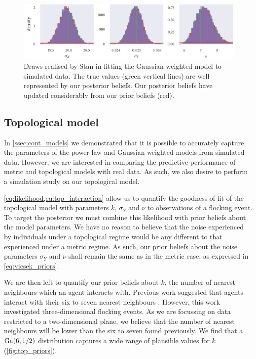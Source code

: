 \begin{figure}[tbp]
  \includegraphics{stan_gauss_hist.pdf}
  \caption{Draws realised by Stan in fitting the Gaussian weighted model to simulated
    data. The true values (green vertical lines) are well represented by our posterior
    beliefs. Our posterior beliefs have updated considerably from our prior beliefs
    (red).}
  \label{fig:gauss_sim_study_hists}
\end{figure}

\subsection{Topological model}

In \cref{ssec:cont_models} we demonstrated that it is possible to accurately capture the
parameters of the power-law and Gaussian weighted models from simulated data. However, we
are interested in comparing the predictive-performance of metric and topological models
with real data. As such, we also desire to perform a simulation study on our topological
model.

\cref{eq:likelihood,eq:top_interaction} allow us to quantify the goodness of fit of the
topological model with parameters $k$, $\sigma_Y$ and $\nu$ to observations of a flocking
event. To target the posterior we must combine this likelihood with prior beliefs about
the model parameters. We have no reason to believe that the noise experienced by
individuals under a topological regime would be any different to that experienced under a
metric regime. As such, our prior beliefs about the noise parameters $\sigma_Y$ and $\nu$
shall remain the same as in the metric case: as expressed in \cref{eq:vicsek_priors}.

We are then left to quantify our prior beliefs about $k$, the number of nearest neighbours
which an agent interacts with. Previous work suggested that agents interact with their six
to seven nearest neighbours \parencite{ballerini08}. However, this work investigated
three-dimensional flocking events. As we are focussing on data restricted to a
two-dimensional plane, we believe that the number of nearest neighbours will be lower than
the six to seven found previously. We find that a $\textrm{Ga}(6, 1/2)$ distribution captures a
wide range of plausible values for $k$ (\cref{fig:top_priors}).

